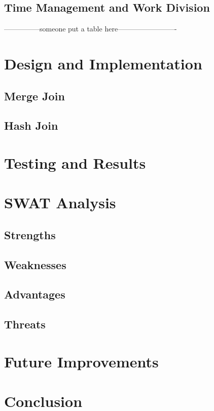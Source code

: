 \documentclass[conference, 11pt]{IEEEtran}
\begin{document}
	\subsection{Time Management and Work Division}
	---------------someone put a table here-------------------------
	
	
\section{Design and Implementation}
	\subsection{Merge Join}
	
	\subsection{Hash Join}

\section{Testing and Results}
	



\section{SWAT Analysis}
	\subsection{Strengths}
	
	\subsection{Weaknesses}
	
	\subsection{Advantages}
	
	\subsection{Threats}
	
	
\section{Future Improvements}

\section{Conclusion}



\end{document}
